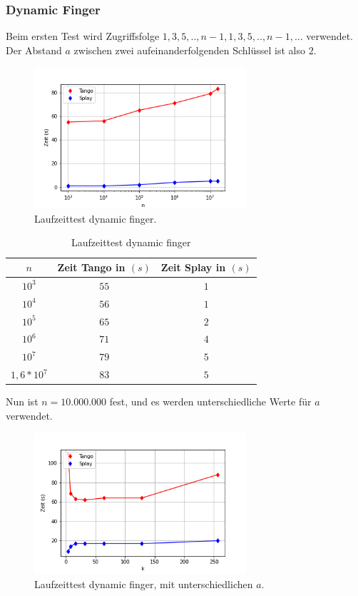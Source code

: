 \documentclass[a4paper,12pt]{article}
\begin{document}
\subsubsection{Dynamic Finger}
Beim ersten Test wird Zugriffsfolge $1, 3, 5,..,n-1, 1, 3, 5, .., n-1,...$ verwendet. Der Abstand $a$ zwischen zwei aufeinanderfolgenden Schlüssel ist also $2$.
\begin{figure}[H]
	\centering
	\includegraphics[width=0.7\textwidth]{"Medien/laufzeittest/diagramm/dynamicfinger"}
	\caption{Laufzeittest dynamic finger.}
\end{figure}
\begin{table}[H]
	\begin{center}
		\begin{tabular}[c]{|c|c|c|}
			\hline
			$n$ & Zeit Tango in $\left(s\right)$ &Zeit Splay in $\left(s\right)$ \\
			\hline
			$10^3$ & $55$ &$1$ \\
			\hline
			$10^4$  & $56$ &$1$  \\
			\hline
			$10^5$  & $65$ &$2$  \\
			\hline
			$10^6$  & $71$ &$4$  \\
			\hline
			$10^7$  & $79$ &$5$  \\
			\hline
			$1,6 *10^7$  & $83$ &$5$  \\
			\hline
		\end{tabular}
		\caption{Laufzeittest dynamic finger} 
	\end{center}
\end{table}
\noindent Nun ist $n = 10.000.000$ fest, und es werden unterschiedliche Werte für $a$ verwendet.
\begin{figure}[H]
	\centering
	\includegraphics[width=0.7\textwidth]{"Medien/laufzeittest/diagramm/dynamicfingerNfest"}
	\caption{Laufzeittest dynamic finger, mit unterschiedlichen $a$.}
\end{figure}
\end{document}

